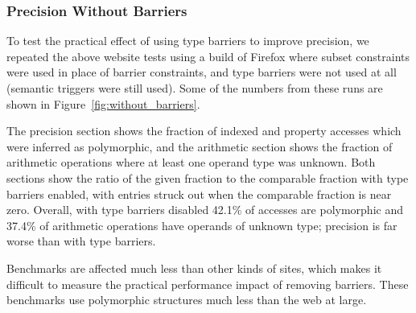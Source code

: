 \subsubsection{Precision Without Barriers}
\label{sec:without_barriers}

To test the practical effect of using type barriers to improve precision,
we repeated the above website tests using a build of Firefox where
subset constraints were used in place of barrier constraints,
and type barriers were not used at all (semantic triggers were still used).
Some of the numbers from these runs are shown in Figure~\ref{fig:without_barriers}.

The precision section shows the fraction of indexed and property accesses which
were inferred as polymorphic, and the arithmetic section shows the fraction
of arithmetic operations where at least one operand type was unknown.
Both sections show the ratio of the given fraction to the comparable fraction
with type barriers enabled,
with entries struck out when the comparable fraction is near zero.
Overall, with type barriers disabled 42.1\% of accesses are polymorphic and 37.4\%
of arithmetic operations have operands of unknown type; precision is far worse
than with type barriers.

Benchmarks are affected much less than other kinds of sites,
which makes it difficult to measure the practical performance impact 
of removing barriers.
These benchmarks use polymorphic structures much less
than the web at large.

